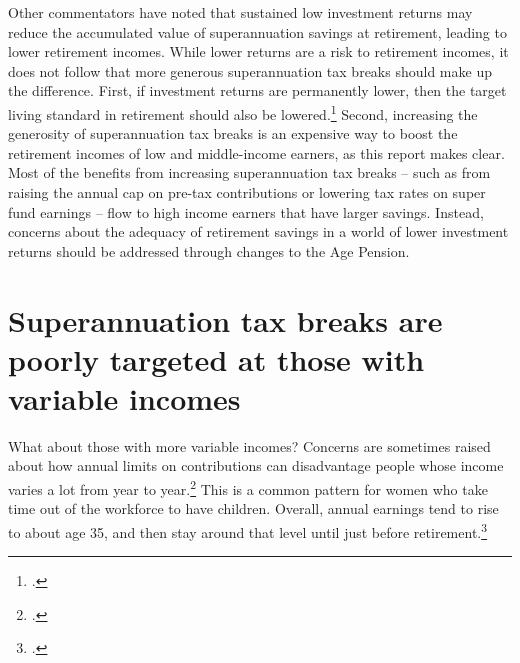 \documentclass{grattanAlpha}
\begin{document}
Other commentators have noted that sustained low investment returns may reduce the accumulated value of superannuation savings at retirement, leading to lower retirement incomes.  While lower returns are a risk to retirement incomes, it does not follow that more generous superannuation tax breaks should make up the difference. First, if investment returns are permanently lower, then the target living standard in retirement should also be lowered.\footcites[][9]{ActuariesInstitute2015RetirementIncomes}{Blayney2015} Second, increasing the generosity of superannuation tax breaks is an expensive way to boost the retirement incomes of low and middle-income earners, as this report makes clear. Most of the benefits from increasing superannuation tax breaks – such as from raising the annual cap on pre-tax contributions or lowering tax rates on super fund earnings – flow to high income earners that have larger savings. Instead, concerns about the adequacy of retirement savings in a world of lower investment returns should be addressed through changes to the Age Pension.

\section{Superannuation tax breaks are poorly targeted at those with variable incomes\label{sec:SUPER-3-4}}
What about those with more variable incomes? Concerns are sometimes raised about how annual limits on contributions can disadvantage people whose income varies a lot from year to year.\footcite[][5]{ASFA2015b} This is a common pattern for women who take time out of the workforce to have children. Overall, annual earnings tend to rise to about age 35, and then stay around that level until just before retirement.\footcite[][18,19,49--50]{DaleyWoodWeidmannEtAl2014}  
\end{document}
